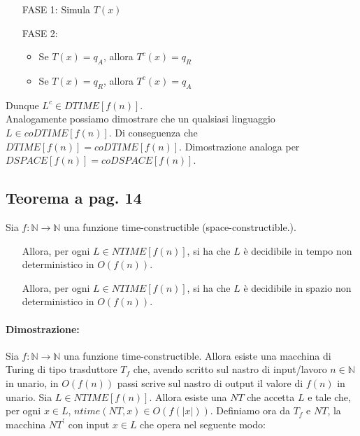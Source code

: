 \begin{enumerate}
    \item [FASE 1:] Simula $T(x)$
    \item [FASE 2:]{
        \begin{itemize}
            \item Se $T(x) = q_{A}$, allora $T^{c}(x) = q_{R}$
            \item Se $T(x) = q_{R}$, allora $T^{c}(x) = q_{A}$
        \end{itemize}
    }
\end{enumerate}
Dunque $L^{c} \in DTIME[f(n)]$.\\
Analogamente possiamo dimostrare che un qualsiasi linguaggio $L \in coDTIME[f(n)]$. Di conseguenza che $DTIME[f(n)] = coDTIME[f(n)]$.
Dimostrazione analoga per $DSPACE[f(n)] = coDSPACE[f(n)]$.
\newpage
\subsection{Teorema a pag. 14}

Sia $f: \mathbb{N} \rightarrow \mathbb{N}$ una funzione time-constructible (space-constructible.).
\begin{itemize}
    \item []{
        Allora, per ogni $L \in NTIME[f(n)]$, si ha che $L$ è decidibile in tempo non deterministico in $O(f(n))$.
    }
    \item []{
        Allora, per ogni $L \in NTIME[f(n)]$, si ha che $L$ è decidibile in spazio non deterministico in $O(f(n))$.
    }
\end{itemize}

\paragraph*{Dimostrazione:} Sia $f: \mathbb{N} \rightarrow \mathbb{N}$ una funzione time-constructible. Allora esiste
una macchina di Turing di tipo trasduttore $T_{f}$ che, avendo scritto sul nastro di input/lavoro $n \in \mathbb{N}$ in 
unario, in $O(f(n))$ passi scrive sul nastro di output il valore di $f(n)$ in unario. Sia $L \in NTIME[f(n)]$. Allora 
esiste una $NT$ che accetta $L$ e tale che, per ogni $x \in L$, $ntime(NT, x) \in O(f(|x|))$. Definiamo ora da $T_{f}$
e $NT$, la macchina $NT^{'}$ con input $x \in L$ che opera nel seguente modo:

